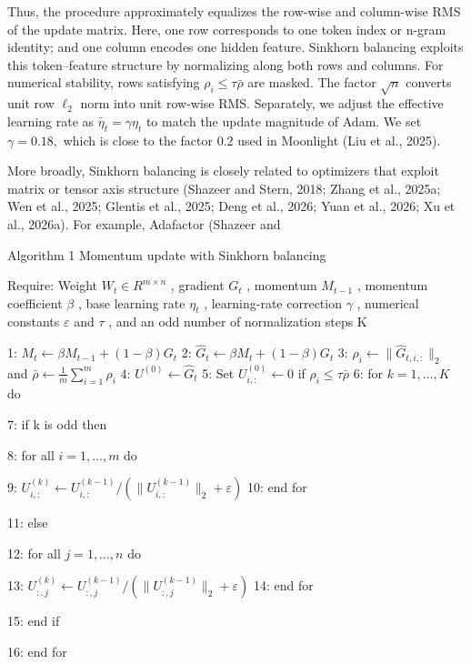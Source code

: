 \documentclass[
  10
]{article}
\begin{document}
Thus, the procedure approximately equalizes the row-wise and column-wise
RMS of the update matrix. Here, one row corresponds to one token index
or n-gram identity; and one column encodes one hidden feature. Sinkhorn
balancing exploits this token--feature structure by normalizing along
both rows and columns. For numerical stability, rows satisfying
\(\rho _ { i } \leqslant \tau \bar { \rho }\) are masked. The factor
\(\sqrt { n }\) converts unit row \(\ell _ { 2 }\) norm into unit
row-wise RMS. Separately, we adjust the effective learning rate as
\(\widetilde { \eta _ { t } } = \gamma \eta _ { t }\) to match the
update magnitude of Adam. We set \(\gamma = 0 . 1 8 ,\) which is close
to the factor 0.2 used in Moonlight (Liu et al., 2025).

More broadly, Sinkhorn balancing is closely related to optimizers that
exploit matrix or tensor axis structure (Shazeer and Stern, 2018; Zhang
et al., 2025a; Wen et al., 2025; Glentis et al., 2025; Deng et al.,
2026; Yuan et al., 2026; Xu et al., 2026a). For example, Adafactor
(Shazeer and

Algorithm 1 Momentum update with Sinkhorn balancing

Require: Weight \(W_{t} \in R^{m \times n}\) , gradient \(G_{t}\) ,
momentum \(M_{t-1}\) , momentum coefficient \(\beta\) , base learning
rate \(\eta_{t}\) , learning-rate correction \(\gamma\) , numerical
constants \(\varepsilon\) and \(\tau\) , and an odd number of
normalization steps K

1: \(M_{t} \leftarrow \beta M_{t-1} + (1 - \beta)G_{t}\) 2:
\(\widehat{G}_{t} \leftarrow \beta M_{t} + (1 - \beta)G_{t}\) 3:
\(\rho_{i} \leftarrow \|\widehat{G}_{t,i,:}\|_{2}\) and
\(\bar{\rho} \leftarrow \frac{1}{m} \sum_{i=1}^{m} \rho_{i}\) 4:
\(U^{(0)} \leftarrow \widehat{G}_{t}\) 5: Set
\(U_{i,:}^{(0)} \leftarrow 0\) if \(\rho_{i} \leqslant \tau\bar{\rho}\)
6: for \(k = 1, \ldots, K\) do

7: if k is odd then

8: for all \(i = 1, \ldots, m\) do

9:
\(U_{i,:}^{(k)} \leftarrow U_{i,:}^{(k-1)} / (\|U_{i,:}^{(k-1)}\|_{2} + \varepsilon)\)
10: end for

11: else

12: for all \(j = 1, \ldots, n\) do

13:
\(U_{:,j}^{(k)} \leftarrow U_{:,j}^{(k-1)} / (\|U_{:,j}^{(k-1)}\|_{2} + \varepsilon)\)
14: end for

15: end if

16: end for
\end{document}
